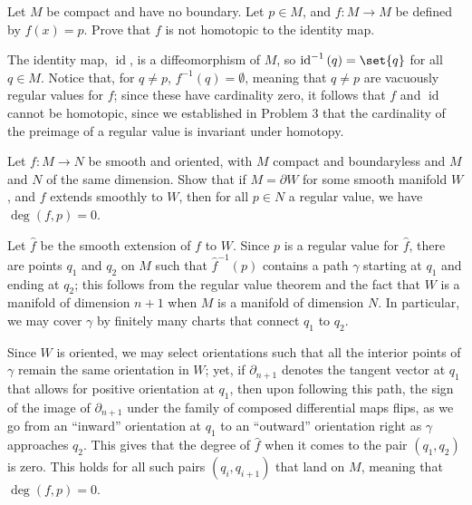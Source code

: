 \documentclass[10pt]{mypackage}
\begin{document}
\begin{problem}[Problem 5]
  Let $M$ be compact and have no boundary. Let $p\in M$, and $f\colon M\rightarrow M$ be defined by $f(x) = p$. Prove that $f$ is not homotopic to the identity map.
\end{problem}
\begin{solution}
  The identity map, $ \operatorname{id} $, is a diffeomorphism of $M$, so $\operatorname{id}^{-1}\left( q \right) = \set{q}$ for all $q\in M$. Notice that, for $q\neq p$, $f^{-1}\left( q \right) = \emptyset$, meaning that $q\neq p$ are vacuously regular values for $f$; since these have cardinality zero, it follows that $f$ and $ \operatorname{id} $ cannot be homotopic, since we established in Problem 3 that the cardinality of the preimage of a regular value is invariant under homotopy.
\end{solution}
\begin{problem}[Problem 6]
  Let $f\colon M\rightarrow N$ be smooth and oriented, with $M$ compact and boundaryless and $M$ and $N$ of the same dimension. Show that if $M = \partial W$ for some smooth manifold $W$, and $f$ extends smoothly to $W$, then for all $p\in N$ a regular value, we have $\operatorname{deg}\left( f,p \right) = 0$.
\end{problem}
\begin{solution}
  Let $\hat{f}$ be the smooth extension of $f$ to $W$. Since $p$ is a regular value for $\hat{f}$, there are points $q_1$ and $q_2$ on $M$ such that $\hat{f}^{-1}\left( p \right)$ contains a path $\gamma$ starting at $q_1$ and ending at $q_2$; this follows from the regular value theorem and the fact that $W$ is a manifold of dimension $n + 1$ when $M$ is a manifold of dimension $N$. In particular, we may cover $\gamma$ by finitely many charts that connect $q_1$ to $q_2$.\newline

  Since $W$ is oriented, we may select orientations such that all the interior points of $\gamma$ remain the same orientation in $W$; yet, if $\partial_{n+1}$ denotes the tangent vector at $q_1$ that allows for positive orientation at $q_1$, then upon following this path, the sign of the image of $\partial_{n+1}$ under the family of composed differential maps flips, as we go from an ``inward'' orientation at $q_1$ to an ``outward'' orientation right as $\gamma$ approaches $q_2$. This gives that the degree of $\hat{f}$ when it comes to the pair $\left( q_1,q_2 \right)$ is zero. This holds for all such pairs $\left( q_i,q_{i+1} \right)$ that land on $M$, meaning that $ \operatorname{deg}\left( f,p \right) = 0 $.
\end{solution}
\end{document}
